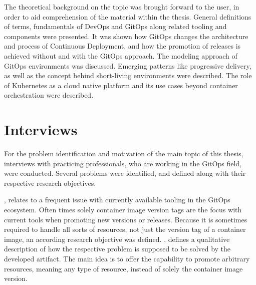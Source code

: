 The theoretical background on the topic was brought forward to the user,
in order to aid comprehension of the material within the thesis.
General definitions of terms,
fundamentals of DevOps and GitOps along related tooling and components were presented.
It was shown how GitOps changes the architecture and process of Continuous Deployment,
and how the promotion of releases is achieved without and with the GitOps approach.
The modeling approach of GitOps environments was discussed.
Emerging patterns like progressive delivery,
as well as the concept behind short-living environments were described.
The role of Kubernetes as a cloud native platform and its use cases beyond container orchestration were described.

\section*{Interviews}

For the problem identification and motivation of the main topic of this thesis,
interviews with practicing professionals, who are working in the GitOps field, were conducted.
Several problems were identified,
and defined along with their respective research objectives.

\textit{},
relates to a frequent issue with currently available tooling in the GitOps ecosystem. 
Often times solely container image version tags are the focus with current tools when promoting
new versions or releases.
Because it is sometimes required to handle all sorts of resources, not just the version tag of a container image,
an according research objective was defined.
\textit{},
defines a qualitative description of how the respective problem is supposed to be solved
by the developed artifact. The main idea is to offer the capability to promote arbitrary resources,
meaning any type of resource, instead of solely the container image version.

